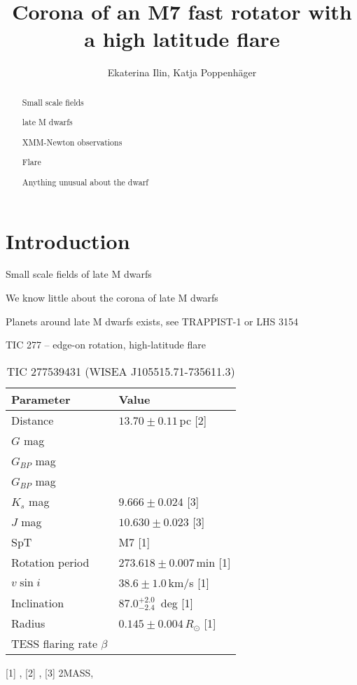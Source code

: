 \documentclass[twocolumn]{aastex631}
\begin{document}
\title{Corona of an M7 fast rotator with a high latitude flare}

\author{Ekaterina Ilin, Katja Poppenh\"ager}


\begin{abstract}
    Small scale fields

    late M dwarfs

    XMM-Newton observations

    Flare

    Anything unusual about the dwarf
    
\end{abstract}

\section{Introduction}
\label{sec:intro}

Small scale fields of late M dwarfs

We know little about the corona of late M dwarfs

Planets around late M dwarfs exists, see TRAPPIST-1 or LHS 3154~\citep{stefansson2023extreme}

TIC 277 -- edge-on rotation, high-latitude flare



\begin{table}

    \caption{TIC 277539431 (WISEA J105515.71-735611.3)}
    \begin{tabular}{ll}\hline 
         Parameter & Value  \\\hline
         Distance & $13.70\pm0.11\,$pc [2] \\
         $G$ mag & \\
         $G_{BP}$ mag & \\
         $G_{BP}$ mag & \\
         $K_s$ mag & $9.666 \pm 0.024$ [3]\\
         $J$ mag & $10.630 \pm 0.023$ [3] \\
         SpT & M7 [1]\\
         Rotation period & $273.618 \pm 0.007\,$min [1]\\
         $v\sin i$ & $38.6\pm1.0\,$km/s [1] \\
         Inclination & $87.0^{+2.0}_{-2.4}\,$ deg [1]\\
         Radius & $0.145\pm0.004\,R_\odot$ [1]\\
         TESS flaring rate $\beta$ &  \\\hline
        
    \end{tabular}
    \newline\footnotesize
    [1] \citet{ilin2021giant}, [2] \citet{bailer-jones2018estimating}, [3] 2MASS, \citet{skrutskie2006two}
    \label{tab:modelparams}
\end{table}
\end{document}
